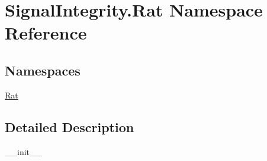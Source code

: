 \hypertarget{namespaceSignalIntegrity_1_1Rat}{}\section{Signal\+Integrity.\+Rat Namespace Reference}
\label{namespaceSignalIntegrity_1_1Rat}
\subsection*{Namespaces}
\begin{DoxyCompactItemize}
\item 
 \hyperlink{namespaceSignalIntegrity_1_1Rat_1_1Rat}{Rat}
\end{DoxyCompactItemize}


\subsection{Detailed Description}
\begin{DoxyVerb}__init__\end{DoxyVerb}
 